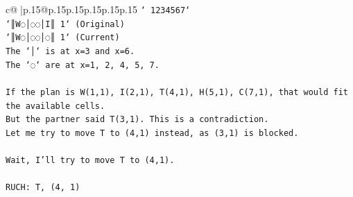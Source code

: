 \documentclass{article}
\begin{document}
{\begin{supertabular}{c@{$\;$}|p{.15\linewidth}@{}p{.15\linewidth}p{.15\linewidth}p{.15\linewidth}p{.15\linewidth}p{.15\linewidth}}
{{{\texttt{` 1234567`} \\
\texttt{`║W◌│◌◌│I║ 1` (Original)} \\
\texttt{`║W◌│◌◌│◌║ 1` (Current)} \\
\texttt{The `│` is at x=3 and x=6.} \\
\texttt{The `◌` are at x=1, 2, 4, 5, 7.} \\
\\ 
\texttt{If the plan is W(1,1), I(2,1), T(4,1), H(5,1), C(7,1), that would fit the available cells.} \\
\texttt{But the partner said T(3,1). This is a contradiction.} \\
\texttt{Let me try to move T to (4,1) instead, as (3,1) is blocked.} \\
\\ 
\texttt{Wait, I'll try to move T to (4,1).} \\
\\ 
\texttt{RUCH: T, (4, 1)} \\
            }
        }
    }
     \\ \\


\end{supertabular}}
\end{document}
